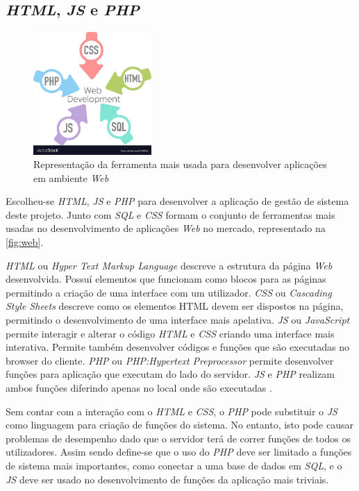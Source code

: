 \documentclass[11pt,twoside,a4paper]{report}
\begin{document}
\subsection{\textit{HTML}, \textit{JS} e \textit{PHP}}
\begin{figure}[H]
	\begin{center}
		\includegraphics[trim={0 3cm 0 0},clip,width=0.4\textwidth]{web} %
		\caption[Representaçoã da ferramenta mais usada para desenvolver aplicações \textit{Web}]{Representação da ferramenta mais usada para desenvolver aplicações em ambiente \textit{Web} \cite{web_logo}}
		\label{fig:web}
	\end{center}
\end{figure}
Escolheu-se \textit{HTML}, \textit{JS} e \textit{PHP} para desenvolver a aplicação de gestão de sistema deste projeto. Junto com \textit{SQL} e \textit{CSS} formam o conjunto de ferramentas mais usadas no desenvolvimento de aplicações \textit{Web} no mercado, representado na \autoref{fig:web}.\par 
\textit{HTML} ou \textit{Hyper Text Markup Language} descreve a estrutura da página \textit{Web} desenvolvida. Possuí elementos que funcionam como blocos para as páginas permitindo a criação de uma interface com um utilizador. \textit{CSS} ou \textit{Cascading Style Sheets} descreve como os elementos HTML devem ser dispostos na página, permitindo o desenvolvimento de uma interface mais apelativa. \textit{JS} ou \textit{JavaScript} permite interagir e alterar o código \textit{HTML} e \textit{CSS} criando uma interface mais interativa. Permite também desenvolver códigos e funções que são executadas no browser do cliente. \textit{PHP} ou \textit{PHP:Hypertext Preprocessor} permite desenvolver funções para aplicação que executam do lado do servidor. \textit{JS} e \textit{PHP} realizam ambos funções diferindo apenas no local onde são executadas \cite{web}.\par
Sem contar com a interação com o \textit{HTML} e \textit{CSS}, o \textit{PHP} pode substituir o \textit{JS} como linguagem para criação de funções do sistema. No entanto, isto pode causar problemas de desempenho dado que o servidor terá de correr funções de todos os utilizadores. Assim sendo define-se que o uso do \textit{PHP} deve ser limitado a funções de sistema mais importantes, como conectar a uma base de dados em \textit{SQL}, e o \textit{JS} deve ser usado no desenvolvimento de funções da aplicação mais triviais.
\end{document}
